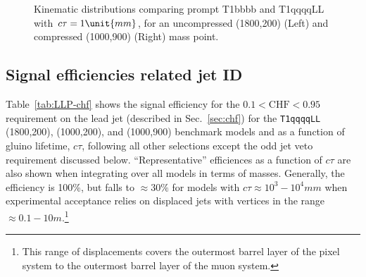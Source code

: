 \begin{figure}[h!]
\begin{center}
     \\
     ~
    \caption{Kinematic distributions comparing prompt T1bbbb and
      T1qqqqLL with $\ctau = 1\unit{mm}$, for an uncompressed
      (1800,200) (Left) and compressed (1000,900) (Right) mass point.}
    \label{fig:T1qqqqLLvsT1bbbb}
  \end{center}
\end{figure}

\clearpage
\subsection{Signal efficiencies related jet ID}
\label{app:LLP-jetid}

Table~\ref{tab:LLP-chf} shows the signal efficiency for the $0.1 <
\text{CHF} < 0.95$ requirement on the lead jet (described in
Sec.~\ref{sec:chf}) for the \texttt{T1qqqqLL} (1800,200), (1000,200),
and (1000,900) benchmark models and as a function of gluino lifetime,
$c\tau$, following all other selections except the odd jet veto
requirement discussed below. ``Representative'' efficiences as a
function of $c\tau$ are also shown when integrating over all models in
terms of masses.  Generally, the efficiency is 100\%, but falls to
${\approx}30\%$ for models with $c\tau \approx 10^{3} -
10^{4}\unit{mm}$ when experimental acceptance relies on displaced jets
with vertices in the range $\approx 0.1-10\unit{m}$.\footnote{This
  range of displacements covers the outermost barrel layer of the
  pixel system to the outermost barrel layer of the muon system.}


